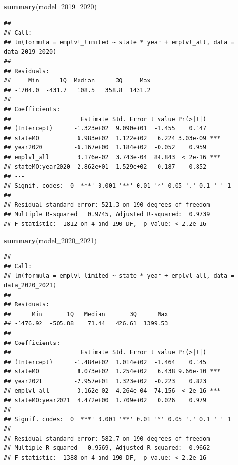 \documentclass[
]{article}
\newenvironment{Shaded}{\begin{snugshade}}{\end{snugshade}}
\newcommand{\FunctionTok}[1]{\textcolor[rgb]{0.13,0.29,0.53}{\textbf{#1}}}
\newcommand{\NormalTok}[1]{#1}
\begin{document}
\begin{Shaded}
\begin{Highlighting}[]
\FunctionTok{summary}\NormalTok{(model\_2019\_2020)}
\end{Highlighting}
\end{Shaded}

\begin{verbatim}
## 
## Call:
## lm(formula = emplvl_limited ~ state * year + emplvl_all, data = data_2019_2020)
## 
## Residuals:
##     Min      1Q  Median      3Q     Max 
## -1704.0  -431.7   108.5   358.8  1431.2 
## 
## Coefficients:
##                    Estimate Std. Error t value Pr(>|t|)    
## (Intercept)      -1.323e+02  9.090e+01  -1.455    0.147    
## stateMO           6.983e+02  1.122e+02   6.224 3.03e-09 ***
## year2020         -6.167e+00  1.184e+02  -0.052    0.959    
## emplvl_all        3.176e-02  3.743e-04  84.843  < 2e-16 ***
## stateMO:year2020  2.862e+01  1.529e+02   0.187    0.852    
## ---
## Signif. codes:  0 '***' 0.001 '**' 0.01 '*' 0.05 '.' 0.1 ' ' 1
## 
## Residual standard error: 521.3 on 190 degrees of freedom
## Multiple R-squared:  0.9745, Adjusted R-squared:  0.9739 
## F-statistic:  1812 on 4 and 190 DF,  p-value: < 2.2e-16
\end{verbatim}

\begin{Shaded}
\begin{Highlighting}[]
\FunctionTok{summary}\NormalTok{(model\_2020\_2021)}
\end{Highlighting}
\end{Shaded}

\begin{verbatim}
## 
## Call:
## lm(formula = emplvl_limited ~ state * year + emplvl_all, data = data_2020_2021)
## 
## Residuals:
##      Min       1Q   Median       3Q      Max 
## -1476.92  -505.88    71.44   426.61  1399.53 
## 
## Coefficients:
##                    Estimate Std. Error t value Pr(>|t|)    
## (Intercept)      -1.484e+02  1.014e+02  -1.464    0.145    
## stateMO           8.073e+02  1.254e+02   6.438 9.66e-10 ***
## year2021         -2.957e+01  1.323e+02  -0.223    0.823    
## emplvl_all        3.162e-02  4.264e-04  74.156  < 2e-16 ***
## stateMO:year2021  4.472e+00  1.709e+02   0.026    0.979    
## ---
## Signif. codes:  0 '***' 0.001 '**' 0.01 '*' 0.05 '.' 0.1 ' ' 1
## 
## Residual standard error: 582.7 on 190 degrees of freedom
## Multiple R-squared:  0.9669, Adjusted R-squared:  0.9662 
## F-statistic:  1388 on 4 and 190 DF,  p-value: < 2.2e-16
\end{verbatim}
\end{document}
